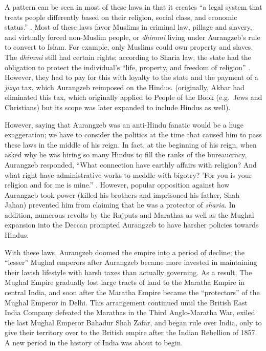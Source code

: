 \documentclass[11pt, letterpaper]{article}
\begin{document}
A pattern can be seen in most of these laws in that it creates ``a legal
system that treats people differently based on their religion, social
class, and economic status.'' \cite{baillie}. Most of these laws favor Muslims
in criminal law, pillage and slavery, and virtually forced non-Muslim
people, or \emph{dhimmi} living under Aurangzeb's rule to convert to
Islam. For example, only Muslims could own property and slaves. The
\emph{dhimmi} still had certain rights; according to Sharia law, the
state had the obligation to protect the individual's ``life, property,
and freedom of religion'' \cite{glenn}. However, they had to pay for this
with loyalty to the state and the payment of a \emph{jizya} tax, which
Aurangzeb reimposed on the Hindus. (originally, Akbar had eliminated
this tax, which originally applied to People of the Book (e.g.~Jews and
Christians) but its scope was later expanded to include Hindus as well).

However, saying that Aurangzeb was an anti-Hindu fanatic would be a huge
exaggeration; we have to consider the politics at the time that caused
him to pass these laws in the middle of his reign. In fact, at the
beginning of his reign, when asked why he was hiring so many Hindus to
fill the ranks of the bureaucracy, Aurangzeb responded, ``What
connection have earthly affairs with religion? And what right have
administrative works to meddle with bigotry? 'For you is your religion
and for me is mine.'' \cite{baillie}. However, popular
opposition against how Aurangzeb took power (killed his brothers and
imprisoned his father, Shah Jahan) prevented him from claiming that he
was a protector of \emph{sharia}. In addition, numerous revolts by the
Rajputs and Marathas as well as the Mughal expansion into the Deccan
prompted Aurangzeb to have harsher policies towards Hindus.

With these laws, Aurangzeb doomed the empire into a period of decline;
the ``lesser'' Mughal emperors after Aurangzeb became more invested in
maintaining their lavish lifestyle with harsh taxes than actually
governing. As a result, The Mughal Empire gradually lost large tracts of
land to the Maratha Empire in central India, and soon after the Maratha
Empire became the ``protectors'' of the Mughal Emperor in Delhi. This
arrangement continued until the British East India Company defeated the
Marathas in the Third Anglo-Maratha War, exiled the last Mughal Emperor
Bahadur Shah Zafar, and began rule over India, only to give their
territory over to the British empire after the Indian Rebellion of 1857.
A new period in the history of India was about to begin.
\end{document}
